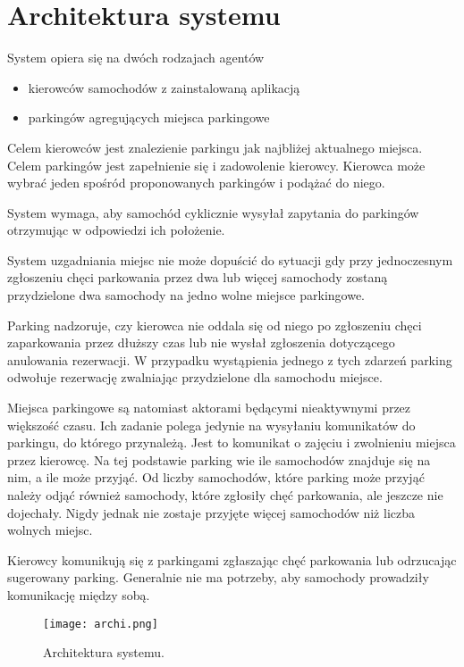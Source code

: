 \newpage
\section{Architektura systemu}

System opiera się na dwóch rodzajach agentów
\begin{itemize}
\item kierowców samochodów z zainstalowaną aplikacją
\item parkingów agregujących miejsca parkingowe
\end{itemize}

Celem kierowców jest znalezienie parkingu jak najbliżej aktualnego miejsca.
Celem parkingów jest zapełnienie się i zadowolenie kierowcy. Kierowca może wybrać jeden spośród proponowanych parkingów i podążać do niego.

System wymaga, aby samochód cyklicznie wysyłał zapytania do parkingów otrzymując w odpowiedzi ich położenie. 

System uzgadniania miejsc nie może dopuścić do sytuacji gdy przy jednoczesnym zgłoszeniu chęci parkowania przez dwa lub więcej samochody zostaną przydzielone dwa samochody na jedno wolne miejsce parkingowe.

Parking nadzoruje, czy kierowca nie oddala się od niego po zgłoszeniu chęci zaparkowania przez dłuższy czas lub nie wysłał zgłoszenia dotyczącego anulowania rezerwacji. W przypadku wystąpienia jednego z tych zdarzeń parking odwołuje rezerwację zwalniając przydzielone dla samochodu miejsce.

Miejsca parkingowe są natomiast aktorami będącymi nieaktywnymi przez większość czasu. Ich zadanie polega jedynie na wysyłaniu komunikatów do parkingu, do którego przynależą. Jest to komunikat o zajęciu i zwolnieniu miejsca przez kierowcę. Na tej podstawie parking wie ile samochodów znajduje się na nim, a ile może przyjąć. Od liczby samochodów, które parking może przyjąć należy odjąć również samochody, które zgłosiły chęć parkowania, ale jeszcze nie dojechały. Nigdy jednak nie zostaje przyjęte więcej samochodów niż liczba wolnych miejsc.

Kierowcy komunikują się z parkingami zgłaszając chęć parkowania lub odrzucając sugerowany parking. Generalnie nie ma potrzeby, aby samochody prowadziły komunikację między sobą.


\begin{figure}[H]
    \label{fig:architektura}
    \centering \texttt{[image: archi.png]}
    \caption{Architektura systemu.}
\end{figure}